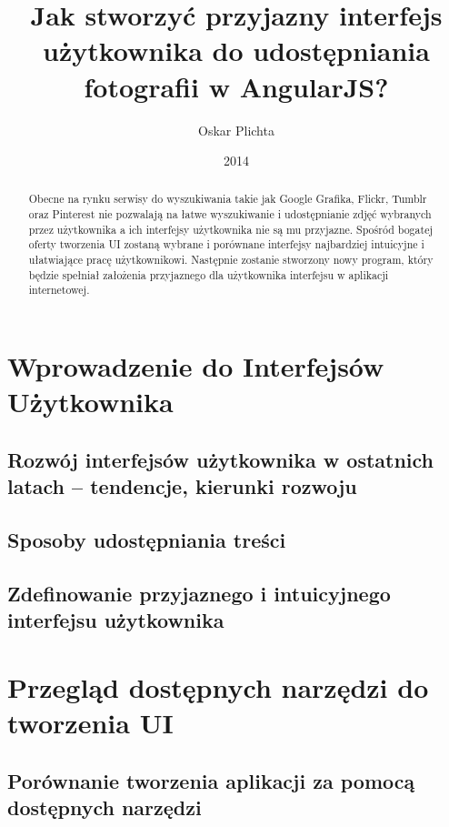 \documentclass[brudnopis]{xmgr}
\author   {Oskar Plichta}
\title    {Jak stworzyć przyjazny interfejs użytkownika do udostępniania fotografii w AngularJS? }
\date     {2014}
\begin{document}
\begin{abstract}
 Obecne na rynku serwisy do wyszukiwania takie jak Google Grafika, Flickr, Tumblr oraz Pinterest nie pozwalają na łatwe wyszukiwanie i udostępnianie zdjęć wybranych przez użytkownika a ich interfejsy użytkownika nie są mu przyjazne. Spośród bogatej oferty tworzenia UI zostaną wybrane i porównane interfejsy najbardziej intuicyjne i ułatwiające pracę użytkownikowi. Następnie zostanie stworzony nowy program, który będzie spełniał założenia przyjaznego dla użytkownika interfejsu w aplikacji internetowej.
\end{abstract}

\maketitle
%
\introduction

\chapter{Wprowadzenie do Interfejsów Użytkownika}

\section{Rozwój interfejsów użytkownika w ostatnich latach – tendencje, kierunki rozwoju}

\section{Sposoby udostępniania treści\label{s:dtd}}

\section{Zdefinowanie przyjaznego i intuicyjnego interfejsu użytkownika}

\chapter{Przegląd dostępnych narzędzi do tworzenia UI }

\section{ Porównanie tworzenia aplikacji za pomocą dostępnych narzędzi\label{s:dsssl}}
\end{document}
